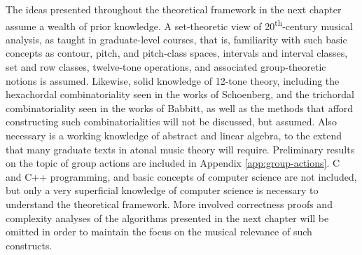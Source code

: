 The ideas presented throughout the theoretical framework in the next chapter assume a wealth of prior knowledge. A set-theoretic view of 20\textsuperscript{th}-century musical analysis, as taught in graduate-level courses, that is, familiarity with such basic concepts as contour, pitch, and pitch-class spaces, intervals and interval classes, set and row classes, twelve-tone operations, and associated group-theoretic notions is assumed. Likewise, solid knowledge of 12-tone theory, including the hexachordal combinatoriality seen in the works of Schoenberg, and the trichordal combinatoriality seen in the works of Babbitt, as well as the methods that afford constructing such combinatorialities will not be discussed, but assumed. Also necessary is a working knowledge of abstract and linear algebra, to the extend that many graduate texts in atonal music theory will require. Preliminary results on the topic of group actions are included in Appendix \ref{app:group-actions}. C and C++ programming, and basic concepts of computer science are not included, but only a very superficial knowledge of computer science is necessary to understand the theoretical framework. More involved correctness proofs and complexity analyses of the algorithms presented in the next chapter will be omitted in order to maintain the focus on the musical relevance of such constructs.
